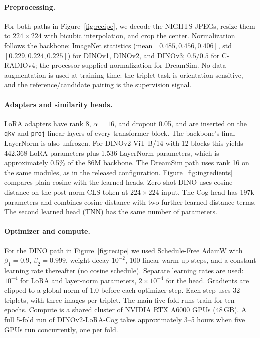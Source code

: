 \paragraph{Preprocessing.} For both paths in Figure~\ref{fig:recipe}, we decode the NIGHTS JPEGs, resize them to $224\times 224$ with bicubic interpolation, and crop the center. Normalization follows the backbone: ImageNet statistics (mean $[0.485, 0.456, 0.406]$, std $[0.229, 0.224, 0.225]$) for DINOv1, DINOv2, and DINOv3; $0.5/0.5$ for C-RADIOv4; the processor-supplied normalization for DreamSim. No data augmentation is used at training time: the triplet task is orientation-sensitive, and the reference/candidate pairing is the supervision signal.

\paragraph{Adapters and similarity heads.} LoRA adapters have rank 8, $\alpha = 16$, and dropout 0.05, and are inserted on the \texttt{qkv} and \texttt{proj} linear layers of every transformer block. The backbone's final LayerNorm is also unfrozen. For DINOv2 ViT-B/14 with 12 blocks this yields 442{,}368 LoRA parameters plus 1{,}536 LayerNorm parameters, which is approximately 0.5\% of the 86M backbone. The DreamSim path uses rank 16 on the same modules, as in the released configuration. Figure~\ref{fig:ingredients} compares plain cosine with the learned heads. Zero-shot DINO uses cosine distance on the post-norm CLS token at $224\times224$ input. The Cog head has 197k parameters and combines cosine distance with two further learned distance terms. The second learned head (TNN) has the same number of parameters.

\paragraph{Optimizer and compute.} For the DINO path in Figure~\ref{fig:recipe} we used Schedule-Free AdamW \citep{defazio2024schedulefree} with $\beta_1 = 0.9$, $\beta_2 = 0.999$, weight decay $10^{-2}$, 100 linear warm-up steps, and a constant learning rate thereafter (no cosine schedule). Separate learning rates are used: $10^{-4}$ for LoRA and layer-norm parameters, $2\times 10^{-4}$ for the head. Gradients are clipped to a global norm of 1.0 before each optimizer step. Each step uses 32 triplets, with three images per triplet. The main five-fold runs train for ten epochs. Compute is a shared cluster of NVIDIA RTX A6000 GPUs (48\,GB). A full 5-fold run of DINOv2-LoRA-Cog takes approximately 3--5 hours when five GPUs run concurrently, one per fold.

